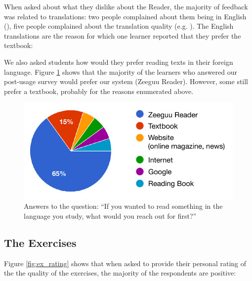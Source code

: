 
When asked about what they dislike about the Reader, the majority of feedback was related to translations: two people complained about them being in English (), five people complained about the translation quality (e.g. ). The English translations are the reason for which one learner reported that they prefer the textbook: 


We also asked students how would they prefer reading texts in their foreign language.
 Figure \ref{fig:preferred_reader} shows that the majority of the learners who answered our post-usage survey would prefer our system (Zeeguu Reader). However, some still prefer a textbook, probably for the reasons enumerated above.

 \begin{figure}[h!]
    \centering
      \includegraphics[width=0.6\columnwidth]{figures/opinions/reader_vs_textbook.pdf}
      \caption{Answers to the question: {``If you wanted to read something in the language you study, what would you reach out for first?''}}
      \label{fig:preferred_reader}
    \end{figure}



\subsection{The Exercises}
Figure \ref{fig:ex_rating} shows that when asked to provide their personal rating of the the quality of the exercises, the majority of the respondents are positive: 


